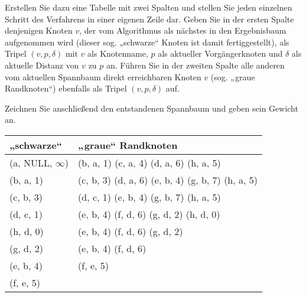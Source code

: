 \documentclass{lehramt-informatik-aufgabe}
\begin{document}
\begin{enumerate}
Erstellen Sie dazu eine Tabelle mit zwei Spalten und stellen Sie jeden
einzelnen Schritt des Verfahrens in einer eigenen Zeile dar. Geben Sie
in der ersten Spalte denjenigen Knoten $v$, der vom Algorithmus als
nächstes in den Ergebnisbaum aufgenommen wird (dieser sog.
„schwarze“ Knoten ist damit fertiggestellt), als Tripel $(v, p, \delta)$
mit $v$ als Knotenname, $p$ als aktueller Vorgängerknoten und $\delta$
als aktuelle Distanz von $v$ zu $p$ an. Führen Sie in der zweiten Spalte
alle anderen vom aktuellen Spannbaum direkt erreichbaren Knoten $v$
(sog. „graue Randknoten“) ebenfalls als Tripel $(v, p, \delta)$ auf.

Zeichnen Sie anschließend den entstandenen Spannbaum und geben sein
Gewicht an.

\begin{liAntwort}

\begin{tabular}{l|l}
„schwarze“ & „graue“ Randknoten \\\hline\hline
(a, NULL, $\infty$) & (b, a, 1) (c, a, 4) (d, a, 6) (h, a, 5) \\\hline
(b, a, 1) & (c, b, 3) (d, a, 6) (e, b, 4) (g, b, 7) (h, a, 5)  \\\hline
(c, b, 3) & (d, c, 1) (e, b, 4) (g, b, 7) (h, a, 5) \\\hline
(d, c, 1) & (e, b, 4) (f, d, 6) (g, d, 2) (h, d, 0) \\\hline
(h, d, 0) & (e, b, 4) (f, d, 6) (g, d, 2) \\\hline
(g, d, 2) & (e, b, 4) (f, d, 6) \\\hline
(e, b, 4) & (f, e, 5) \\\hline
(f, e, 5) & \\\hline
\end{tabular}

\begin{center}


\end{center}
\end{liAntwort}
\end{enumerate}
\end{document}
